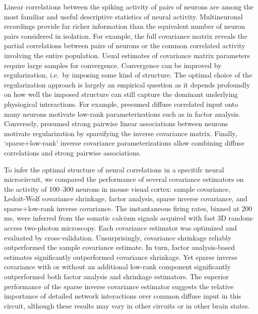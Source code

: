 Linear correlations between the spiking activity of pairs of neurons are among the most familiar and useful descriptive statistics of neural activity.
Multineuronal recordings provide far richer information than the equivalent number of neuron pairs considered in isolation.
For example, the full covariance matrix reveals the partial correlations between pairs of neurons or the common correlated activity involving the entire population.
Usual estimates of covariance matrix parameters require large samples for convergence.
Convergence can be improved by regularization, i.e.~by imposing some kind of structure.  
The optimal choice of the regularization approach is largely an empirical question as it depends profoundly on how well the imposed structure can still capture the dominant underlying physiogical interactions.
For example, presumed diffuse correlated input onto many neurons motivate low-rank parameterizations such as in factor analysis.  
Conversely, presumed strong pairwise linear associations between neurons motivate regularization by sparsifying the inverse covariance matrix.
Finally, `sparse+low-rank' inverse covariance parameterizations allow combining diffuse correlations and strong pairwise associations.  

To infer the optimal structure of neural correlations in a specitifc neural microcircuit, we compared the performance of several covariance estimators on the activity of 100--300 neurons in mouse visual cortex: sample covariance, Ledoit-Wolf covariance shrinkage, factor analysis, sparse inverse covariance, and sparse+low-rank inverse covariance.
The instantaneous firing rates, binned at 200 ms, were inferred from the somatic calcium signals acquired with fast 3D random-access two-photon microscopy.   
Each covariance estimator was optimized and evaluated by cross-validation.
Unsurprisingly, covariance shrinkage reliably outperformed the sample covariance estimate.
In turn, factor analysis-based estimates significantly outperformed covariance shrinkage.
Yet sparse inverse covariance with or without an additional low-rank component significantly outperformed both factor analysis and shrinkage  estimators.
The superior performance of the sparse inverse covariance estimator suggests the relative importance of detailed network interactions over common diffuse input in this circuit, although these results may vary in other circuits or in other brain states.